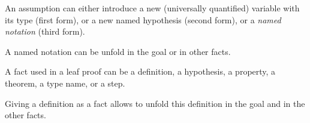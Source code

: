 
An assumption can either introduce a new (universally quantified)
variable with its type (first form), or a new named hypothesis (second
form), or a {\em named notation} (third form).

A named notation can be unfold in the goal or in other facts.

\begin{syn}
 \is
\alt {}
\alt {}
\alt {}
\alt {}
\end{syn}


A fact used in a leaf proof can be a definition, a hypothesis, a
property, a theorem, a type name, or a step.

Giving a definition as a fact allows {\zenon} to unfold this
definition in the goal and in the other facts.

